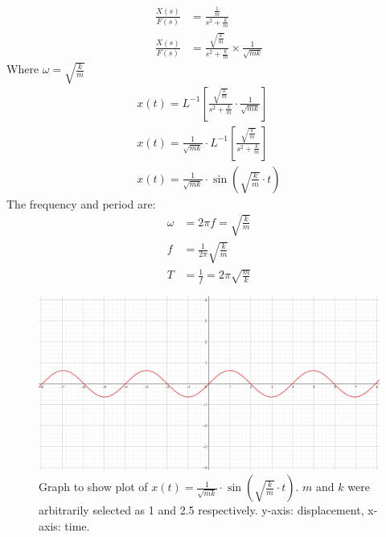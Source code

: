 \documentclass[12pt]{article}
\numberwithin{equation}{section}
\begin{document}
\begin{align}
  \frac{X(s)}{F(s)} &= \frac{\frac{1}{m}}{s^2 + \frac{k}{m}}\\
  \frac{X(s)}{F(s)} &= \frac{\sqrt{\frac{k}{m}}}{s^2 + \frac{k}{m}} \times \frac{1}{\sqrt{mk}}
\end{align}
Where $\omega = \sqrt{\frac{k}{m}}$
\begin{align}
  x(t) = L^{-1} \left[ \frac{\sqrt{\frac{k}{m}}}{s^2 + \frac{k}{m}} \cdot \frac{1}{\sqrt{mk}} \right]\\
  x(t) = \frac{1}{\sqrt{mk}} \cdot L^{-1} \left[ \frac{\sqrt{\frac{k}{m}}}{s^2 + \frac{k}{m}} \right]\\
  x(t) = \frac{1}{\sqrt{mk}} \cdot \sin{\left(\sqrt{\frac{k}{m}}\cdot t\right)}
\end{align}
The frequency and period are:
\begin{align}
  \omega &= 2\pi f = \sqrt{\frac{k}{m}}\\
  f &= \frac{1}{2\pi}\sqrt{\frac{k}{m}}\\
  T &= \frac{1}{f} = 2\pi\sqrt{\frac{m}{k}}
\end{align}
\begin{figure}[H]
  \centering
  \includegraphics[width=\textwidth]{./img/3-1timeresponse.png}
  \caption{Graph to show plot of $x(t) = \frac{1}{\sqrt{mk}} \cdot \sin{\left(\sqrt{\frac{k}{m}}\cdot t\right)}$. $m$ and $k$ were arbitrarily selected as 1 and 2.5 respectively. y-axis: displacement, x-axis: time.}
\end{figure}
\end{document}
